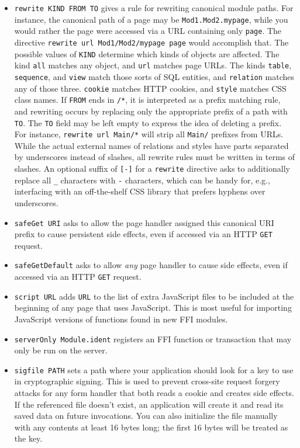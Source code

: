 \documentclass{article}
\newcommand{\cd}[1]{\texttt{#1}}
\begin{document}
\begin{itemize}
\item \texttt{rewrite KIND FROM TO} gives a rule for rewriting canonical module paths.  For instance, the canonical path of a page may be \texttt{Mod1.Mod2.mypage}, while you would rather the page were accessed via a URL containing only \texttt{page}.  The directive \texttt{rewrite url Mod1/Mod2/mypage page} would accomplish that.  The possible values of \texttt{KIND} determine which kinds of objects are affected.  The kind \texttt{all} matches any object, and \texttt{url} matches page URLs.  The kinds \texttt{table}, \texttt{sequence}, and \texttt{view} match those sorts of SQL entities, and \texttt{relation} matches any of those three.  \texttt{cookie} matches HTTP cookies, and \texttt{style} matches CSS class names.  If \texttt{FROM} ends in \texttt{/*}, it is interpreted as a prefix matching rule, and rewriting occurs by replacing only the appropriate prefix of a path with \texttt{TO}.  The \texttt{TO} field may be left empty to express the idea of deleting a prefix.  For instance, \texttt{rewrite url Main/*} will strip all \texttt{Main/} prefixes from URLs.  While the actual external names of relations and styles have parts separated by underscores instead of slashes, all rewrite rules must be written in terms of slashes.  An optional suffix of \cd{[-]} for a \cd{rewrite} directive asks to additionally replace all \cd{\_} characters with \cd{-} characters, which can be handy for, e.g., interfacing with an off-the-shelf CSS library that prefers hyphens over underscores.
\item \texttt{safeGet URI} asks to allow the page handler assigned this canonical URI prefix to cause persistent side effects, even if accessed via an HTTP \cd{GET} request.
\item \texttt{safeGetDefault} asks to allow \emph{any} page handler to cause side effects, even if accessed via an HTTP \cd{GET} request.
\item \texttt{script URL} adds \texttt{URL} to the list of extra JavaScript files to be included at the beginning of any page that uses JavaScript.  This is most useful for importing JavaScript versions of functions found in new FFI modules.
\item \texttt{serverOnly Module.ident} registers an FFI function or transaction that may only be run on the server.
\item \texttt{sigfile PATH} sets a path where your application should look for a key to use in cryptographic signing.  This is used to prevent cross-site request forgery attacks for any form handler that both reads a cookie and creates side effects.  If the referenced file doesn't exist, an application will create it and read its saved data on future invocations.  You can also initialize the file manually with any contents at least 16 bytes long; the first 16 bytes will be treated as the key.

\end{itemize}
\end{document}
